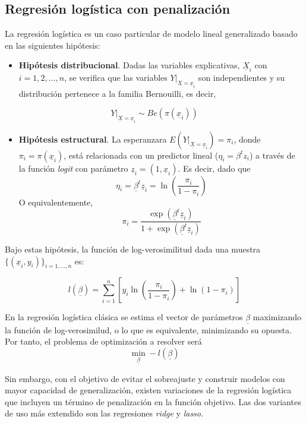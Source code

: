 \documentclass[12pt,a4paper,]{book}
\providecommand{\tightlist}{%
  \setlength{\itemsep}{0pt}\setlength{\parskip}{0pt}}
\numberwithin{dummy}{section}
\theoremstyle{ocrenumbox}
\theoremstyle{blacknumex}
\theoremstyle{blacknumbox}
\theoremstyle{ocrenum}
\theoremstyle{ocrenum}
\begin{document}
\hypertarget{regresiuxf3n-loguxedstica-con-penalizaciuxf3n}{%
\subsection{Regresión logística con
penalización}\label{regresiuxf3n-loguxedstica-con-penalizaciuxf3n}}

La regresión logística es un caso particular de modelo lineal
generalizado basado en las siguientes hipótesis:

\begin{itemize}
\tightlist
\item
  \textbf{Hipótesis distribucional}. Dadas las variables explicativas,
  \(\underline X_i\) con \(i = 1,2,...,n\), se verifica que las
  variables \(Y|_{\underline X= \underline x_i}\) son independientes y
  su distribución pertenece a la familia Bernouilli, es decir,
\end{itemize}

\[Y|_{\underline X= \underline x_i} \sim Be(\pi( \underline x_i))\]

\begin{itemize}
\tightlist
\item
  \textbf{Hipótesis estructural}. La esperanzara
  \(E(Y|_{\underline X = \underline x_i}) = \pi_i\), donde
  \(\pi_i = \pi( \underline x_i)\), está relacionada con un predictor
  lineal (\(\eta_i = \beta^t z_i\)) a través de la función \emph{logit}
  con parámetro \(\underline z_i = \left(1,\underline x_i\right)\). Es
  decir, dado que
  \[\eta_i = \underline \beta^t \underline z_i= \ln\left(\frac{\pi_i}{1-\pi_i}\right)\]
  O equivalentemente,
  \[\pi_i = \frac{\exp(\underline \beta^t \underline z_i)}{1 + \exp(\underline \beta^t \underline z_i)}\]
\end{itemize}

Bajo estas hipótesis, la función de log-verosimilitud dada una muestra
\(\{ (\underline x_i,y_i) \}_{i=1,...,n}\) es:

\[ l(\underline \beta) = 
\sum_{i=1}^n \left[ 
y_i\ln \left( \frac{\pi_i}{1-\pi_i} \right) + 
\ln \left( 1 - \pi_i\right) \right]\]

En la regresión logística clásica se estima el vector de parámetros
\(\underline \beta\) maximizando la función de log-verosimilud, o lo que
es equivalente, minimizando su opuesta. Por tanto, el problema de
optimización a resolver será
\[\min_{\underline \beta} -l(\underline \beta)\]

Sin embargo, con el objetivo de evitar el sobreajuste y construir
modelos con mayor capacidad de generalización, existen variaciones de la
regresión logística que incluyen un término de penalización en la
función objetivo. Las dos variantes de uso más extendido son las
regresiones \emph{ridge} y \emph{lasso}.
\end{document}
